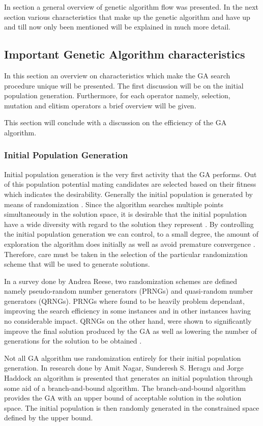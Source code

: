 In section a general overview of genetic algorithm flow was presented. In the next section various characteristics that make up the genetic algorithm and have up and till now only been mentioned will be explained in much more detail.
\subsection{Important Genetic Algorithm characteristics}
In this section an overview on characteristics which make the GA search procedure unique will be presented. The first discussion will be on the initial population generation. Furthermore, for each operator namely, selection, mutation and elitism operators a brief overview will be given.

This section will conclude with a discussion on the efficiency of the GA algorithm.
\subsubsection{Initial Population Generation}
Initial population generation is the very first activity that the GA performs. Out of this population potential mating candidates are selected based on their fitness which indicates the desirability. Generally the initial population is generated by means of randomization \cite{SelfAdaptiveGA}. Since the algorithm searches multiple points simultaneously in the solution space, it is desirable that the initial population have a wide diversity with regard to the solution they represent \cite{CombinedBranchBoundGA,DistributedHierarchicalGA}. By controlling the initial population generation we can control, to a small degree, the amount of exploration the algorithm does initially as well as avoid premature convergence \cite{CombinedBranchBoundGA}. Therefore, care must be taken in the selection of the particular randomization scheme that will be used to generate solutions.

In a survey done by Andrea Reese\cite{RandomNumberGA}, two randomization schemes are defined namely pseudo-random number generators (PRNGs) and quasi-random number generators (QRNGs). PRNGs where found to be heavily problem dependant, improving the search efficiency in some instances and in other instances having no considerable impact. QRNGs on the other hand, were shown to significantly improve the final solution produced by the GA as well as lowering the number of generations for the solution to be obtained \cite{RandomNumberGA}.

Not all GA algorithm use randomization entirely for their initial population generation. In research done by Amit Nagar, Sunderesh S. Heragu and Jorge Haddock\cite{CombinedBranchBoundGA} an algorithm is presented that generates an initial population through some aid of a branch-and-bound algorithm. The branch-and-bound algorithm provides the GA with an upper bound of acceptable solution in the solution space. The initial population is then randomly generated in the constrained space defined by the upper bound\cite{CombinedBranchBoundGA}.
